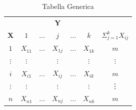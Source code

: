 \begin{table}[ht]
	\begin{center}
		\caption{Tabella Generica}\label{tab:gen}
		\begin{tabular}{lcccccc}
			
			& & & & & & \\ \hline
			\multicolumn{1}{|c}{}  & \multicolumn{5}{|c|}{\bf Y} &
			\multicolumn{1}{c|}{} \\
			
			\multicolumn{1}{|c}{\bf X} & \multicolumn{1}{|c}{$1$} & $\ldots$ & $j$ & $\ldots$ &
			\multicolumn{1}{c|}{$k$} & \multicolumn{1}{c|}{$\Sigma_{j=1}^k{X_{ij}}$} \\ \hline
			
			\multicolumn{1}{|c}{$1$} & \multicolumn{1}{|c}{$X_{11}$} & $\ldots$ & $X_{1j}$ &
			$\ldots$ & \multicolumn{1}{c|}{$X_{1k}$} &
			\multicolumn{1}{c|}{$m$}\\
			
			\multicolumn{1}{|c}{$\vdots$} & \multicolumn{1}{|c}{$\vdots$} &  & $\vdots$ &  &
			\multicolumn{1}{c|}{$\vdots$} &
			\multicolumn{1}{c|}{$\vdots$}\\
			
			\multicolumn{1}{|c}{$i$} & \multicolumn{1}{|c}{$X_{i1}$} & $\dots$ & $X_{ij}$ &
			$\ldots$ & \multicolumn{1}{c|}{$X_{ik}$} &
			\multicolumn{1}{c|}{$m$} \\
			
			\multicolumn{1}{|c}{$\vdots$} & \multicolumn{1}{|c}{$\vdots$} &
			& $\vdots$ &  & \multicolumn{1}{c|}{$\vdots$} & \multicolumn{1}{c|}{\vdots} \\
			
			\multicolumn{1}{|c}{$n$} & \multicolumn{1}{|c}{$X_{n1}$} & $\dots$ & $X_{nj}$ &
			$\ldots$ & \multicolumn{1}{c|}{$X_{nk}$} & \multicolumn{1}{c|}{$m$}\\ \hline
			
		\end{tabular}
	\end{center}
\end{table}